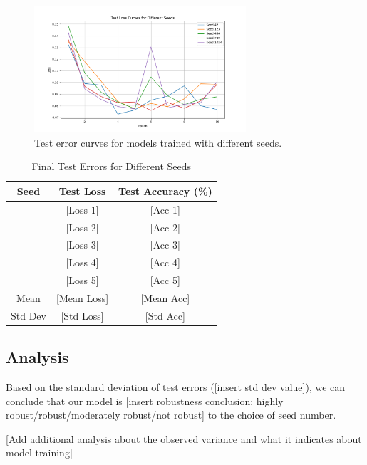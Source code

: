 \documentclass[12pt]{article}
\begin{document}
\begin{figure}[H]
    \centering
    \includegraphics[width=0.7\textwidth]{seed_test_loss_curves.png}
    \caption{Test error curves for models trained with different seeds.}
    \label{fig:seed_curves}
\end{figure}

\begin{table}[H]
    \centering
    \caption{Final Test Errors for Different Seeds}
    \label{tab:seed_results}
    \begin{tabular}{ccc}
        \toprule
        Seed & Test Loss & Test Accuracy (\%) \\
        \midrule
        [Seed 1] & [Loss 1] & [Acc 1] \\
        [Seed 2] & [Loss 2] & [Acc 2] \\
        [Seed 3] & [Loss 3] & [Acc 3] \\
        [Seed 4] & [Loss 4] & [Acc 4] \\
        [Seed 5] & [Loss 5] & [Acc 5] \\
        \midrule
        Mean & [Mean Loss] & [Mean Acc] \\
        Std Dev & [Std Loss] & [Std Acc] \\
        \bottomrule
    \end{tabular}
\end{table}

\subsection{Analysis}
Based on the standard deviation of test errors ([insert std dev value]), we can conclude that our model is [insert robustness conclusion: highly robust/robust/moderately robust/not robust] to the choice of seed number. 

[Add additional analysis about the observed variance and what it indicates about model training]
\end{document}
